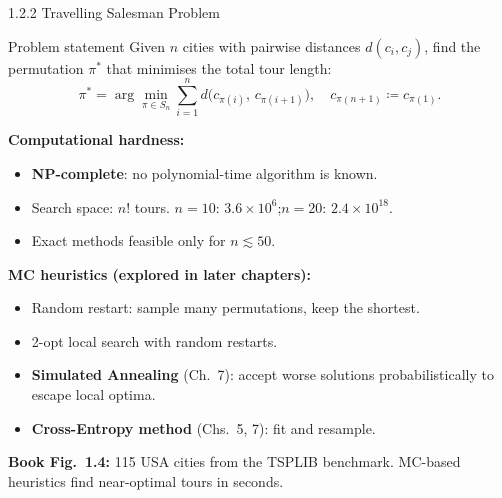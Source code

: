\documentclass[aspectratio=169,10pt]{beamer}
\begin{document}
\begin{frame}[allowframebreaks]{1.2.2 Travelling Salesman Problem}

  \begin{block}{Problem statement}
    Given $n$ cities with pairwise distances $d(c_i, c_j)$, find the
    permutation $\pi^*$ that minimises the total tour length:
    \[
      \pi^* = \arg\min_{\pi \in S_n}
      \sum_{i=1}^{n} d\!\bigl(c_{\pi(i)},\, c_{\pi(i+1)}\bigr),
      \quad c_{\pi(n+1)} \coloneqq c_{\pi(1)}.
    \]
  \end{block}

  \textbf{Computational hardness:}
  \begin{itemize}
    \item \textbf{NP-complete}: no polynomial-time algorithm is known.
    \item Search space: $n!$ tours.
      $n=10$: $3.6\times10^6$;\quad $n=20$: $2.4\times10^{18}$.
    \item Exact methods feasible only for $n \lesssim 50$.
  \end{itemize}

  \textbf{MC heuristics (explored in later chapters):}
  \begin{itemize}
    \item Random restart: sample many permutations, keep the shortest.
    \item 2-opt local search with random restarts.
    \item \textbf{Simulated Annealing} (Ch.~7): accept worse solutions
      probabilistically to escape local optima.
    \item \textbf{Cross-Entropy method} (Chs.~5, 7): fit and resample.
  \end{itemize}

  \textbf{Book Fig.~1.4:} 115 USA cities from the TSPLIB benchmark.
  MC-based heuristics find near-optimal tours in seconds.

\end{frame}
\end{document}

